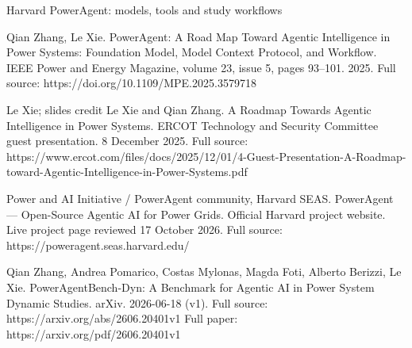 \begin{frame}[t]{Harvard PowerAgent: models, tools and study workflows}
{Qian Zhang, Le Xie. PowerAgent: A Road Map Toward Agentic Intelligence in Power Systems: Foundation Model, Model Context Protocol, and Workflow. IEEE Power and Energy Magazine, volume 23, issue 5, pages 93--101. 2025.
Full source: https://doi.org/10.1109/MPE.2025.3579718

Le Xie; slides credit Le Xie and Qian Zhang. A Roadmap Towards Agentic Intelligence in Power Systems. ERCOT Technology and Security Committee guest presentation. 8 December 2025.
Full source: https://www.ercot.com/files/docs/2025/12/01/4-Guest-Presentation-A-Roadmap-toward-Agentic-Intelligence-in-Power-Systems.pdf

Power and AI Initiative / PowerAgent community, Harvard SEAS. PowerAgent --- Open-Source Agentic AI for Power Grids. Official Harvard project website. Live project page reviewed 17 October 2026.
Full source: https://poweragent.seas.harvard.edu/

Qian Zhang, Andrea Pomarico, Costas Mylonas, Magda Foti, Alberto Berizzi, Le Xie. PowerAgentBench-Dyn: A Benchmark for Agentic AI in Power System Dynamic Studies. arXiv. 2026-06-18 (v1).
Full source: https://arxiv.org/abs/2606.20401v1
Full paper: https://arxiv.org/pdf/2606.20401v1}
\end{frame}

